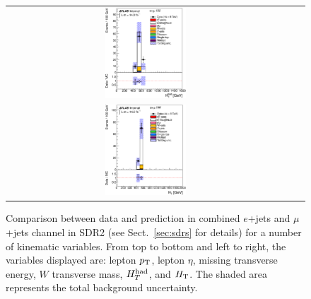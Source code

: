 \begin{figure}[h!]
\begin{center}
\begin{tabular}{ccc}
\includegraphics[width=0.30\textwidth]{appendices/figures/sdrs/HTHad_ELEMUONCR1_1W_NOMINAL.eps}  \\
\includegraphics[width=0.30\textwidth]{appendices/figures/sdrs/HTAll_ELEMUONCR1_1W_NOMINAL.eps}  &  &\\
\end{tabular}\caption{\small {Comparison between data and prediction in combined $e$+jets and $\mu$+jets channel in SDR2 (see Sect.~\ref{sec:sdrs} for details) 
for a number of kinematic variables. From top to bottom and left to right, the variables displayed are: lepton $\pt$, lepton $\eta$, missing transverse energy, $W$ transverse mass,
$\hthad$, and $\HT$. The shaded area represents the total background uncertainty.}}
\label{fig:ELEMUONCR1_1}
\end{center}
\end{figure}                                                                             


